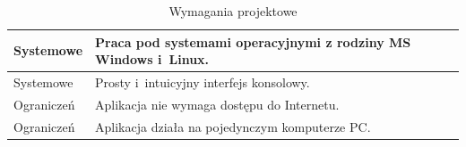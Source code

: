 \documentclass[../thesis.tex]{subfiles}
\begin{document}
\begin{table}[h]
\begin{center}
\begin{tabular}{ | l | p{110mm} | }
Systemowe & Praca pod systemami operacyjnymi z rodziny MS Windows i~Linux. \\\hline
Systemowe & Prosty i~intuicyjny interfejs konsolowy. \\\hline 

Ograniczeń & Aplikacja nie wymaga dostępu do Internetu. \\\hline
Ograniczeń & Aplikacja działa na pojedynczym komputerze PC. \\\hline

\end{tabular}
\caption{Wymagania projektowe}
\label{req:table}
\end{center}
\end{table}
\end{document}
